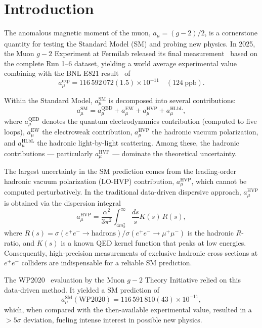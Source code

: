 \section{Introduction}
\label{sec:intro}

The anomalous magnetic moment of the muon, \(a_\mu = (g-2)/2\), is a cornerstone quantity for testing the Standard Model (SM) and probing new physics. In 2025, the Muon \(g-2\) Experiment at Fermilab released its final measurement~\cite{Aguillard2025,Driutti2025} based on the complete Run 1--6 dataset, yielding a world average experimental value combining with the BNL E821 result~\cite{Bennett2006} of
\[
a_\mu^{\mathrm{exp}} = 116\,592\,072(1.5) \times 10^{-11} \quad (124\ \mathrm{ppb}).
\]

Within the Standard Model, \(a_\mu^{\mathrm{SM}}\) is decomposed into several contributions:
\[
a_\mu^{\mathrm{SM}} = a_\mu^{\mathrm{QED}} + a_\mu^{\mathrm{EW}} + a_\mu^{\mathrm{HVP}} + a_\mu^{\mathrm{HLbL}},
\]
where \(a_\mu^{\mathrm{QED}}\) denotes the quantum electrodynamics contribution (computed to five loops), \(a_\mu^{\mathrm{EW}}\) the electroweak contribution, \(a_\mu^{\mathrm{HVP}}\) the hadronic vacuum polarization, and \(a_\mu^{\mathrm{HLbL}}\) the hadronic light-by-light scattering. Among these, the hadronic contributions --- particularly \(a_\mu^{\mathrm{HVP}}\) --- dominate the theoretical uncertainty.

The largest uncertainty in the SM prediction comes from the leading-order hadronic vacuum polarization (LO-HVP) contribution, \(a_\mu^{\mathrm{HVP}}\), which cannot be computed perturbatively. In the traditional data-driven dispersive approach, \(a_\mu^{\mathrm{HVP}}\) is obtained via the dispersion integral~\cite{Brodsky1968,Lautrup1968}
\[
a_\mu^{\mathrm{HVP}} = \frac{\alpha^2}{3\pi^2} \int_{4m_\pi^2}^{\infty} \frac{ds}{s} K(s) \, R(s),
\]
where \(R(s) = \sigma(e^+e^-\to \mathrm{hadrons}) / \sigma(e^+e^-\to \mu^+\mu^-)\) is the hadronic \(R\)-ratio, and \(K(s)\) is a known QED kernel function that peaks at low energies. Consequently, high-precision measurements of exclusive hadronic cross sections at \(e^+e^-\) colliders are indispensable for a reliable SM prediction.

The WP2020~\cite{WP2020} evaluation by the Muon \(g-2\) Theory Initiative relied on this data-driven method. It yielded a SM prediction of
\[
a_\mu^{\mathrm{SM}}(\mathrm{WP2020}) = 116\,591\,810(43) \times 10^{-11},
\]
which, when compared with the then-available experimental value, resulted in a \(>5\sigma\) deviation, fueling intense interest in possible new physics.

